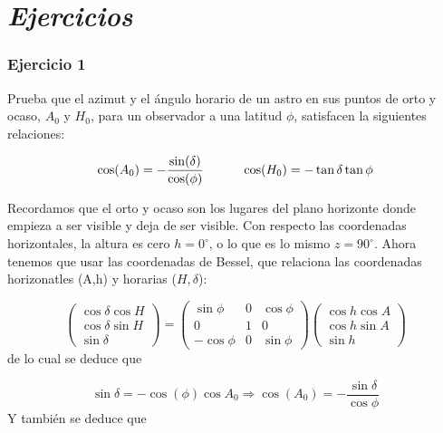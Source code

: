 \newpage
\section*{\textit{Ejercicios}}
\begin{Enunciado}
	\subsubsection{Ejercicio 1}
	Prueba que el azimut y el ángulo horario de un astro en sus puntos de orto y ocaso, $A_0$ y $H_0$, para un observador a una latitud $\phi$, satisfacen la siguientes relaciones:

	\begin{equation}
		\cos (A_0) = - \frac{\sin (\delta)}{\cos (\phi)} \quad \quad \quad \cos (H_0) = - \tan \delta \tan \phi
	\end{equation}
\end{Enunciado}


Recordamos que el orto y ocaso son los lugares del plano horizonte donde empieza a ser visible y deja de ser visible. Con respecto las coordenadas horizontales, la altura es cero $h=0^\circ$, o lo que es lo mismo $z=90^\circ$. Ahora tenemos que usar las coordenadas de Bessel, que relaciona las coordenadas horizonatles (A,h) y horarias ($H,\delta$):

\begin{equation}
	\begin{pmatrix}
		\cos \delta \cos H \\
		\cos \delta \sin H \\
		\sin \delta
	\end{pmatrix} =\begin{pmatrix}
		\sin \phi   & 0 & \cos \phi \\
		0           & 1 & 0         \\
		- \cos \phi & 0 & \sin \phi
	\end{pmatrix}
	\begin{pmatrix}
		\cos h \cos A \\
		\cos h \sin A \\
		\sin h
	\end{pmatrix}
\end{equation}
de lo cual se deduce que

\begin{equation}
	\sin \delta = - \cos (\phi) \cos A_0  \Rightarrow \cos (A_0) = - \frac{\sin \delta}{\cos \phi}
\end{equation}
Y también se deduce que

